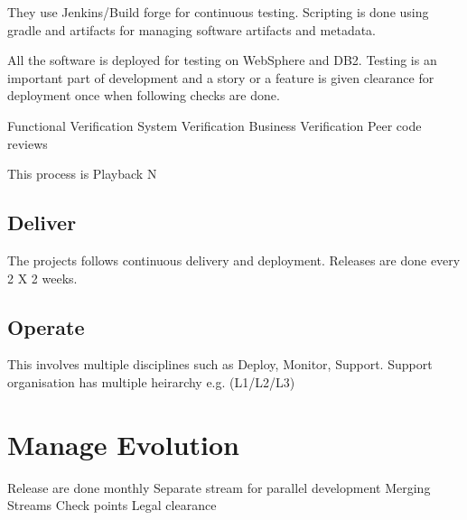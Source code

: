 \documentclass[12pt]{article}
\begin{document}
They use Jenkins/Build forge for continuous testing. Scripting is done using gradle and artifacts for managing software artifacts and metadata.

All the software is deployed for testing on WebSphere and DB2. Testing is an important part of development and a story or a feature is given clearance for deployment once when following checks are done.

Functional Verification
System Verification
Business Verification
Peer code reviews

This process is Playback N

\subsection{Deliver}

The projects follows continuous delivery and deployment. Releases are done every 2 X 2 weeks.

\subsection{Operate}

This involves multiple disciplines such as Deploy, Monitor, Support. Support organisation has multiple heirarchy e.g. (L1/L2/L3)

\section{Manage Evolution}

Release are done monthly
Separate stream for parallel development
Merging Streams
Check points
Legal clearance
\end{document}
